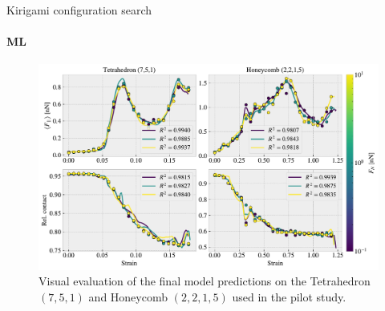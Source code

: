 \documentclass[
	10pt, %
]{beamer}
\begin{document}
%
%
\begin{frame}{Kirigami configuration search}
	\framesubtitle{ML}
	\begin{figure}[H]
		\centering
		\includegraphics[width=0.8\linewidth]{../figures/final_model_evaluation_slide.pdf}
		\caption{Visual evaluation of the final model predictions on the Tetrahedron $(7,5,1)$ and Honeycomb $(2,2,1,5)$ used in the pilot study.}
	\end{figure}  

\end{frame}
%
%
\end{document}
